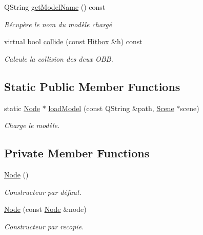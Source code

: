 \begin{DoxyCompactItemize}
Q\+String \hyperlink{class_node_adf80c463ba15d60645252ffa171fd209}{get\+Model\+Name} () const 
\begin{DoxyCompactList}\small\item\em Récupère le nom du modèle chargé \end{DoxyCompactList}\item 
virtual bool \hyperlink{class_node_a07ceab8d57814d67b0a6a3c662130aa2}{collide} (const \hyperlink{class_hitbox}{Hitbox} \&h) const 
\begin{DoxyCompactList}\small\item\em Calcule la collision des deux O\+B\+B. \end{DoxyCompactList}\end{DoxyCompactItemize}
\subsection*{Static Public Member Functions}
\begin{DoxyCompactItemize}
\item 
static \hyperlink{class_node}{Node} $\ast$ \hyperlink{class_node_ac2140ddf8f06f8b5620e6743c945c482}{load\+Model} (const Q\+String \&path, \hyperlink{class_scene}{Scene} $\ast$scene)
\begin{DoxyCompactList}\small\item\em Charge le modèle. \end{DoxyCompactList}\end{DoxyCompactItemize}
\subsection*{Private Member Functions}
\begin{DoxyCompactItemize}
\item 
\hyperlink{class_node_ad7a34779cad45d997bfd6d3d8043c75f}{Node} ()
\begin{DoxyCompactList}\small\item\em Constructeur par défaut. \end{DoxyCompactList}\item 
\hyperlink{class_node_a4bf5930c1238505203c3dcf6e4573bad}{Node} (const \hyperlink{class_node}{Node} \&node)
\begin{DoxyCompactList}\small\item\em Constructeur par recopie. \end{DoxyCompactList}\end{DoxyCompactItemize}
